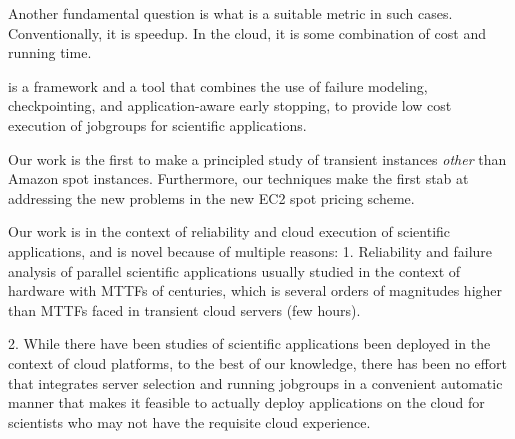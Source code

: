 Another fundamental question is what is a suitable metric in such cases. Conventionally, it is speedup. In the cloud, it is some combination of cost and running time. 


\sysname is a framework and a tool that combines the use of failure modeling, checkpointing, and application-aware early stopping, to provide low cost execution of jobgroups for scientific applications.


Our work is the first to make a principled study of transient instances \emph{other} than Amazon spot instances.
Furthermore, our techniques make the first stab at addressing the new problems in the new EC2 spot pricing scheme.

Our work is in the context of reliability and cloud execution of scientific applications, and is novel because of multiple reasons:
1. Reliability and failure analysis of parallel scientific applications usually studied in the context of hardware with MTTFs of centuries, which is several orders of magnitudes higher than MTTFs faced in transient cloud servers (few hours).

2. While there have been studies of scientific applications been deployed in the context of cloud platforms, to the best of our knowledge, there has been no effort that integrates server selection and running jobgroups in a convenient automatic manner that makes it feasible to actually deploy applications on the cloud for scientists who may not have the requisite cloud experience.


